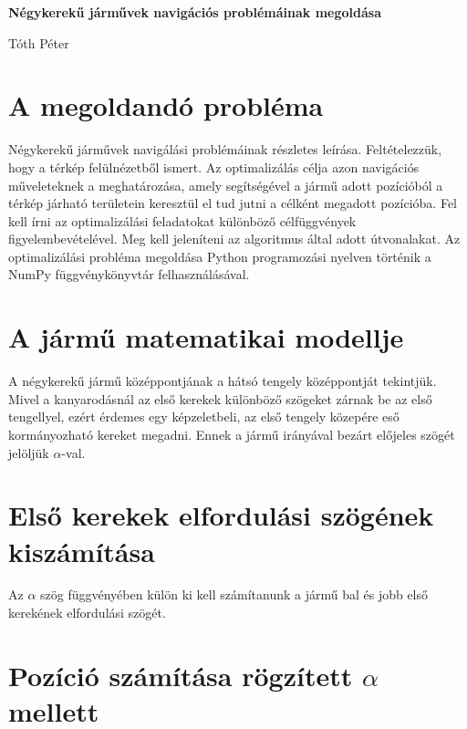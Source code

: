 \documentclass[a4paper]{paper}
\begin{document}
\begin{center}
    \Large
    \textbf{Négykerekű járművek navigációs problémáinak megoldása}
   
    \medskip   
   
    \Large
    Tóth Péter
\end{center}

\vskip 1cm

\pagestyle{empty}

\section{A megoldandó probléma}

Négykerekű járművek navigálási problémáinak részletes leírása. Feltételezzük, hogy a térkép felülnézetből ismert. Az optimalizálás célja azon navigációs műveleteknek a meghatározása, amely segítségével a jármű adott pozícióból a térkép járható területein keresztül el tud jutni a célként megadott pozícióba. Fel kell írni az optimalizálási feladatokat különböző célfüggvények figyelembevételével. Meg kell jeleníteni az algoritmus által adott útvonalakat. Az optimalizálási probléma megoldása Python programozási nyelven történik a NumPy függvénykönyvtár felhasználásával.

\section{A jármű matematikai modellje}

A négykerekű jármű középpontjának a hátsó tengely középpontját tekintjük. Mivel a kanyarodásnál az első kerekek különböző szögeket zárnak be az első tengellyel, ezért érdemes egy képzeletbeli, az első tengely közepére eső kormányozható kereket megadni. Ennek a jármű irányával bezárt előjeles szögét jelöljük $\alpha$-val.

\section{Első kerekek elfordulási szögének kiszámítása}

Az $\alpha$ szög függvényében külön ki kell számítanunk a jármű bal és jobb első kerekének elfordulási szögét.


\section{Pozíció számítása rögzített $\alpha$ mellett}
\end{document}
